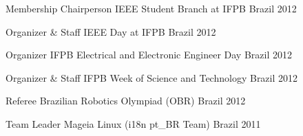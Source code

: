 \begin{cvhonors}
  \cvhonor
    {Membership Chairperson} %
    {IEEE Student Branch at IFPB} %
    {Brazil} %
    {2012} %
    
\cvhonor
    {Organizer \& Staff} %
    {IEEE Day at IFPB} %
    {Brazil} %
    {2012} %
    
  \cvhonor
    {Organizer} %
    {IFPB Electrical and Electronic Engineer Day} %
    {Brazil} %
    {2012} %
        
  \cvhonor
    {Organizer \& Staff} %
    {IFPB Week of Science and Technology} %
    {Brazil} %
    {2012} %

  \cvhonor
    {Referee} %
    {Brazilian Robotics Olympiad (OBR)} %
    {Brazil} %
    {2012} %
    
  \cvhonor
    {Team Leader} %
    {Mageia Linux (i18n pt\_BR Team)} %
    {Brazil} %
    {2011} %
 
\end{cvhonors}
